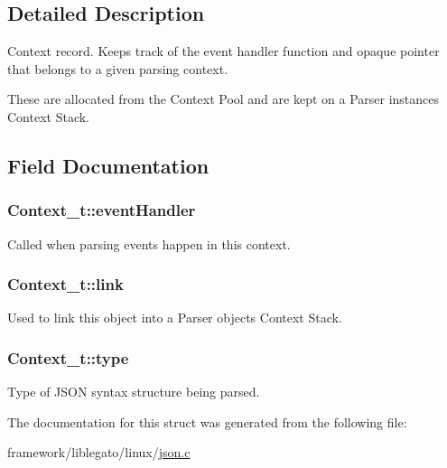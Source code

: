 \subsection{Detailed Description}
Context record. Keeps track of the event handler function and opaque pointer that belongs to a given parsing context.

These are allocated from the Context Pool and are kept on a Parser instance\textquotesingle{}s Context Stack. 

\subsection{Field Documentation}
\subsubsection[{\texorpdfstring{event\+Handler}{eventHandler}}]{ Context\+\_\+t\+::event\+Handler}\hypertarget{struct_context__t_a809bc8337d10446dbe40ddadc27aeb57}{}\label{struct_context__t_a809bc8337d10446dbe40ddadc27aeb57}


Called when parsing events happen in this context. 

\subsubsection[{\texorpdfstring{link}{link}}]{ Context\+\_\+t\+::link}\hypertarget{struct_context__t_ad7010b1f7956a322009ddcf3e8b7e9f4}{}\label{struct_context__t_ad7010b1f7956a322009ddcf3e8b7e9f4}


Used to link this object into a Parser object\textquotesingle{}s Context Stack. 

\subsubsection[{\texorpdfstring{type}{type}}]{ Context\+\_\+t\+::type}\hypertarget{struct_context__t_aaf8b15d30637a3a0e4ad6e8f131fe1ab}{}\label{struct_context__t_aaf8b15d30637a3a0e4ad6e8f131fe1ab}


Type of J\+S\+ON syntax structure being parsed. 



The documentation for this struct was generated from the following file\+:\begin{DoxyCompactItemize}
\item 
framework/liblegato/linux/\hyperlink{json_8c}{json.\+c}\end{DoxyCompactItemize}
